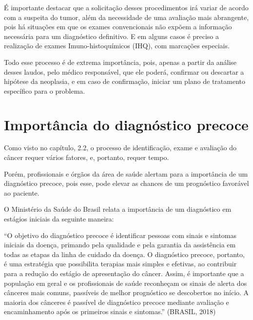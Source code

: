 É importante destacar que a solicitação desses procedimentos irá variar de acordo com a suspeita do tumor, além da necessidade de uma avaliação mais abrangente, pois há situações em que os exames convencionais não expõem a informação necessária para um diagnóstico definitivo. E em alguns casos é preciso a realização de exames Imuno-histoquímicos (IHQ), com marcações especiais.

Todo esse processo é de extrema importância, pois, apenas a partir da análise desses laudos, pelo médico responsável, que ele poderá, confirmar ou descartar a hipótese da neoplasia, e em caso de confirmação, iniciar um plano de tratamento específico para o problema.


\section{\textbf{Importância do diagnóstico precoce}}

Como visto no capítulo, 2.2, o processo de identificação, exame e avaliação do câncer requer vários fatores, e, portanto, requer tempo.

Porém, profissionais e órgãos da área de saúde alertam para a importância de um diagnóstico precoce, pois esse, pode elevar as chances de um prognóstico favorável ao paciente. 

O Ministério da Saúde do Brasil relata a importância de um diagnóstico em estágios iniciais da seguinte maneira:

“O objetivo do diagnóstico precoce é identificar pessoas com sinais e sintomas iniciais da doença, primando pela qualidade e pela garantia da assistência em todas as etapas da linha de cuidado da doença. O diagnóstico precoce, portanto, é uma estratégia que possibilita terapias mais simples e efetivas, ao contribuir para a redução do estágio de apresentação do câncer. Assim, é importante que a população em geral e os profissionais de saúde reconheçam os sinais de alerta dos cânceres mais comuns, passíveis de melhor prognóstico se descobertos no início. A maioria dos cânceres é passível de diagnóstico precoce mediante avaliação e encaminhamento após os primeiros sinais e sintomas.” (BRASIL, 2018)\cite{DIAGNOSTICO} 

